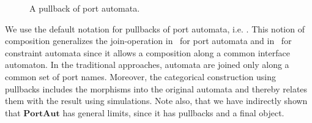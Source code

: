 \documentclass[copyright,creativecommons]{eptcs}
\newcommand{\PA}{\ensuremath{\mathbf{PortAut}}}
\begin{document}
\begin{figure}[t]
\begin{center}


 	\end{center}
\caption{A pullback of port automata.}
\label{fig:port-automata-pullback}
\vspace{-2mm}
\end{figure}


We use the default notation for pullbacks of port automata, i.e.
.
This notion of composition generalizes the join-operation
in~\cite{KC09} for port automata and in~\cite{BSAR06} for constraint automata
since it allows a composition along a common interface automaton. In
the traditional approaches, automata are joined only along a common set of port
names. Moreover, the categorical construction using pullbacks includes the
morphisms into the original automata and thereby relates them with the
result using simulations. Note also, that we have indirectly shown that 
{\PA} has general limits, since it has pullbacks and a final object.
\end{document}
